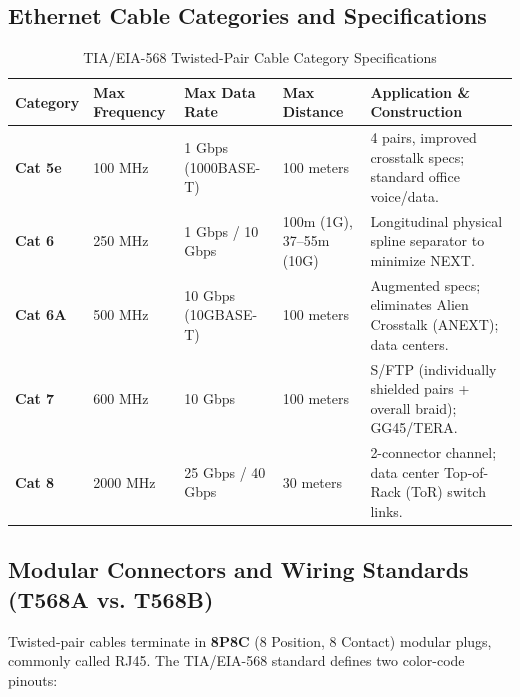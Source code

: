\subsection{Ethernet Cable Categories and Specifications}
\begin{table}[H]
\centering
\small
{}
\begin{tabularx}{\linewidth}{l l l l X}
\toprule
\rowcolor{tableheadercolor}
\textbf{Category} & \textbf{Max Frequency} & \textbf{Max Data Rate} & \textbf{Max Distance} & \textbf{Application \& Construction} \\
\midrule
\textbf{Cat 5e} & 100 MHz & 1 Gbps (1000BASE-T) & 100 meters & 4 pairs, improved crosstalk specs; standard office voice/data. \\
\textbf{Cat 6} & 250 MHz & 1 Gbps / 10 Gbps & 100m (1G), 37--55m (10G) & Longitudinal physical spline separator to minimize NEXT. \\
\textbf{Cat 6A} & 500 MHz & 10 Gbps (10GBASE-T) & 100 meters & Augmented specs; eliminates Alien Crosstalk (ANEXT); data centers. \\
\textbf{Cat 7} & 600 MHz & 10 Gbps & 100 meters & S/FTP (individually shielded pairs + overall braid); GG45/TERA. \\
\textbf{Cat 8} & 2000 MHz & 25 Gbps / 40 Gbps & 30 meters & 2-connector channel; data center Top-of-Rack (ToR) switch links. \\
\bottomrule
\end{tabularx}
\caption{TIA/EIA-568 Twisted-Pair Cable Category Specifications}
\end{table}

\subsection{Modular Connectors and Wiring Standards (T568A vs. T568B)}
Twisted-pair cables terminate in \textbf{8P8C} (8 Position, 8 Contact) modular plugs, commonly called RJ45. The TIA/EIA-568 standard defines two color-code pinouts:

